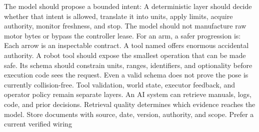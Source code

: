 {}The model should propose a bounded intent:\markdownRendererInterblockSeparator
{}\markdownRendererInterblockSeparator
{}A deterministic layer should decide whether that intent is allowed, translate\markdownRendererSoftLineBreak
{}it into units, apply limits, acquire authority, monitor freshness, and stop.\markdownRendererSoftLineBreak
{}The model should not manufacture raw motor bytes or bypass the controller\markdownRendererSoftLineBreak
{}lease.\markdownRendererParagraphSeparator
{}For an arm, a safer progression is:\markdownRendererInterblockSeparator
{}\markdownRendererInterblockSeparator
{}Each arrow is an inspectable contract.\markdownRendererInterblockSeparator
{}
\markdownRendererSectionEnd \markdownRendererSectionBegin
{}\markdownRendererInterblockSeparator
{}A tool named  offers enormous accidental authority. A\markdownRendererSoftLineBreak
{}robot tool should expose the smallest operation that can be made safe. Its\markdownRendererSoftLineBreak
{}schema should constrain units, ranges, identifiers, and optionality before\markdownRendererSoftLineBreak
{}execution code sees the request.\markdownRendererInterblockSeparator
{}\markdownRendererInterblockSeparator
{}Even a valid schema does not prove the pose is currently collision-free. Tool\markdownRendererSoftLineBreak
{}validation, world state, executor feedback, and operator policy remain separate\markdownRendererSoftLineBreak
{}layers.\markdownRendererInterblockSeparator
{}
\markdownRendererSectionEnd \markdownRendererSectionBegin
{}\markdownRendererInterblockSeparator
{}An AI system can retrieve manuals, logs, code, and prior decisions. Retrieval\markdownRendererSoftLineBreak
{}quality determines which evidence reaches the model. Store documents with\markdownRendererSoftLineBreak
{}source, date, version, authority, and scope. Prefer a current verified wiring\markdownRendererSoftLineBreak
